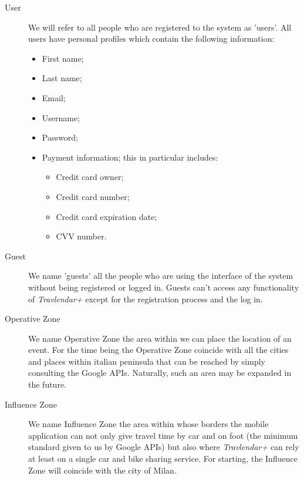 \begin{description}
				\item[User]
					We will refer to all people who are registered to the system as ’users’. 
					All users have personal profiles which contain the following information:
				\begin{itemize}
					\item First name;
					\item Last name; 
					\item Email;
					\item Username;
					\item Password;
					\item Payment information; this in particular includes:
						\begin{itemize}
							\item Credit card owner;
							\item Credit card number;
							\item Credit card expiration date;
							\item CVV number.
						\end{itemize}
				\end{itemize}
				
				\item[Guest] We name 'guests' all the people who are using the interface of the system without being registered or logged in. Guests can't access any functionality of \textit{Travlendar+} except for the registration process and the log in. 
				\item[Operative Zone] We name Operative Zone the area within we can place the location of an event. For the time being the Operative Zone coincide with all the cities and places within italian peninsula that can be reached by simply consulting the Google APIs. Naturally, such an area may be expanded in the future.
				\item[Influence Zone] We name Influence Zone the area within whose borders the mobile application can not only give travel time by car and on foot (the minimum standard given to us by Google APIs) but also where \textit{Travlendar+} can rely at least on a single car and bike sharing service. For starting, the Influence Zone will coincide with the city of Milan.
				

\end{description}
